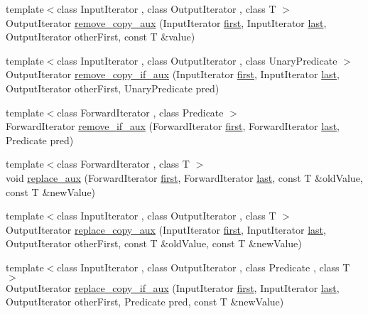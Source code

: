 \begin{DoxyCompactItemize}
\item 
{\footnotesize template$<$class Input\+Iterator , class Output\+Iterator , class T $>$ }\\Output\+Iterator \hyperlink{namespaceprism_ae3f41bf6d9ab98a87d693fba69f138dc}{remove\+\_\+copy\+\_\+aux} (Input\+Iterator \hyperlink{namespaceprism_ae3fb7a1926a9e8e59300cd5e370470da}{first}, Input\+Iterator \hyperlink{namespaceprism_abe4956c4e865f55ca126b7fb973b5078}{last}, Output\+Iterator other\+First, const T \&value)
\item 
{\footnotesize template$<$class Input\+Iterator , class Output\+Iterator , class Unary\+Predicate $>$ }\\Output\+Iterator \hyperlink{namespaceprism_a198b599ea535deb9fdf28c46c8658bd4}{remove\+\_\+copy\+\_\+if\+\_\+aux} (Input\+Iterator \hyperlink{namespaceprism_ae3fb7a1926a9e8e59300cd5e370470da}{first}, Input\+Iterator \hyperlink{namespaceprism_abe4956c4e865f55ca126b7fb973b5078}{last}, Output\+Iterator other\+First, Unary\+Predicate pred)
\item 
{\footnotesize template$<$class Forward\+Iterator , class Predicate $>$ }\\Forward\+Iterator \hyperlink{namespaceprism_a95e9f5186670e27472aa7d8cd02397eb}{remove\+\_\+if\+\_\+aux} (Forward\+Iterator \hyperlink{namespaceprism_ae3fb7a1926a9e8e59300cd5e370470da}{first}, Forward\+Iterator \hyperlink{namespaceprism_abe4956c4e865f55ca126b7fb973b5078}{last}, Predicate pred)
\item 
{\footnotesize template$<$class Forward\+Iterator , class T $>$ }\\void \hyperlink{namespaceprism_ad053e45daef65797bc1cff18dfcd8dc0}{replace\+\_\+aux} (Forward\+Iterator \hyperlink{namespaceprism_ae3fb7a1926a9e8e59300cd5e370470da}{first}, Forward\+Iterator \hyperlink{namespaceprism_abe4956c4e865f55ca126b7fb973b5078}{last}, const T \&old\+Value, const T \&new\+Value)
\item 
{\footnotesize template$<$class Input\+Iterator , class Output\+Iterator , class T $>$ }\\Output\+Iterator \hyperlink{namespaceprism_a7055d91bb6279fa78b8b498297a11eab}{replace\+\_\+copy\+\_\+aux} (Input\+Iterator \hyperlink{namespaceprism_ae3fb7a1926a9e8e59300cd5e370470da}{first}, Input\+Iterator \hyperlink{namespaceprism_abe4956c4e865f55ca126b7fb973b5078}{last}, Output\+Iterator other\+First, const T \&old\+Value, const T \&new\+Value)
\item 
{\footnotesize template$<$class Input\+Iterator , class Output\+Iterator , class Predicate , class T $>$ }\\Output\+Iterator \hyperlink{namespaceprism_a1e660997b10ccb0985b35999c84a9bbf}{replace\+\_\+copy\+\_\+if\+\_\+aux} (Input\+Iterator \hyperlink{namespaceprism_ae3fb7a1926a9e8e59300cd5e370470da}{first}, Input\+Iterator \hyperlink{namespaceprism_abe4956c4e865f55ca126b7fb973b5078}{last}, Output\+Iterator other\+First, Predicate pred, const T \&new\+Value)

\end{DoxyCompactItemize}
